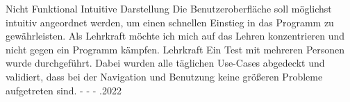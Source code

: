 \begin{myreq}
  \twoinline
    {}
    {\reqtype Nicht Funktional}
    {\reqevent Intuitive Darstellung}
  \reqdesc Die Benutzeroberfläche soll möglichst intuitiv angeordnet werden, um einen schnellen Einstieg in das Programm zu gewährleisten.
  \reqrat Als Lehrkraft möchte ich mich auf das Lehren konzentrieren und nicht gegen ein Programm kämpfen.
  \reqorig Lehrkraft
  \reqfit Ein Test mit mehreren Personen wurde durchgeführt. Dabei wurden alle täglichen Use-Cases abgedeckt und validiert, dass bei der Navigation und Benutzung keine größeren Probleme aufgetreten sind.
  \twoinline
    {}
    {}
  \twoinline
  {\reqdep -}
  {\reqconf -}
  \reqmater -
  .2022
\end{myreq}

